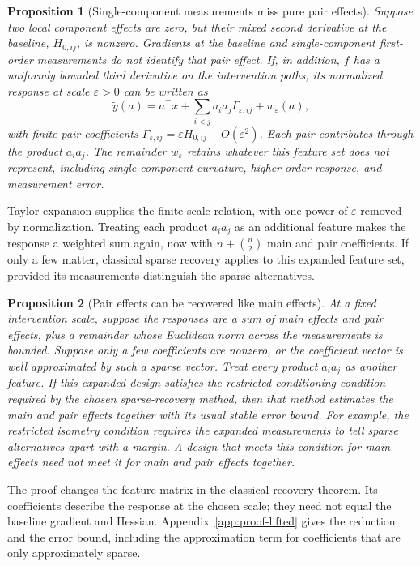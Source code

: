 \documentclass[sigconf,10pt,nonacm,balance=false]{acmart}
\newcommand{\eps}{\varepsilon}
\newtheorem{proposition}{Proposition}
\begin{document}
\begin{proposition}[Single-component measurements miss pure pair effects]\label{prop:blindness}
Suppose two local component effects are zero, but their mixed second derivative at the baseline, $H_{0,ij}$, is nonzero. Gradients at the baseline and single-component first-order measurements do not identify that pair effect. If, in addition, $f$ has a uniformly bounded third derivative on the intervention paths, its normalized response at scale $\eps>0$ can be written as
\begin{equation}
    \widetilde y(a)=a^\top x+\sum_{i<j}a_i a_j\Gamma_{\eps,ij}+w_\eps(a),
\end{equation}
with finite pair coefficients $\Gamma_{\eps,ij}=\eps H_{0,ij}+O(\eps^2)$. Each pair contributes through the product $a_i a_j$. The remainder $w_\eps$ retains whatever this feature set does not represent, including single-component curvature, higher-order response, and measurement error.
\end{proposition}

Taylor expansion supplies the finite-scale relation, with one power of $\eps$ removed by normalization. Treating each product $a_i a_j$ as an additional feature makes the response a weighted sum again, now with $n+\binom{n}{2}$ main and pair coefficients. If only a few matter, classical sparse recovery applies to this expanded feature set, provided its measurements distinguish the sparse alternatives.

\begin{proposition}[Pair effects can be recovered like main effects]\label{prop:lifted}
At a fixed intervention scale, suppose the responses are a sum of main effects and pair effects, plus a remainder whose Euclidean norm across the measurements is bounded. Suppose only a few coefficients are nonzero, or the coefficient vector is well approximated by such a sparse vector. Treat every product $a_i a_j$ as another feature. If this expanded design satisfies the restricted-conditioning condition required by the chosen sparse-recovery method, then that method estimates the main and pair effects together with its usual stable error bound. For example, the restricted isometry condition requires the expanded measurements to tell sparse alternatives apart with a margin. A design that meets this condition for main effects need not meet it for main and pair effects together.
\end{proposition}

The proof changes the feature matrix in the classical recovery theorem. Its coefficients describe the response at the chosen scale; they need not equal the baseline gradient and Hessian. Appendix~\ref{app:proof-lifted} gives the reduction and the error bound, including the approximation term for coefficients that are only approximately sparse.
\end{document}
